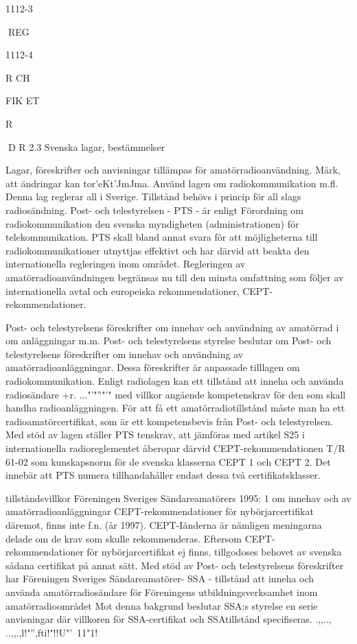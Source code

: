 \documentclass[a4paper,twoside,twocolumn,openright]{book}
\begin{document}
{{{{{1112-3

REG

1112-4

R CH

FIK ET

R

D R
2.3 Svenska lagar, bestämmelser

Lagar, föreskrifter och anvisningar
tillämpas för amatörradioanvändning.
Märk, att ändringar kan tor'eKt'JmJma.
Använd
lagen om radiokommunikation m.fl.
Denna lag reglerar all
i
Sverige. Tillstånd behövs i princip för all
slags radiosändning.
Post- och telestyrelsen - PTS - är enligt
Förordning om radiokommunikation den
svenska myndigheten (administrationen) för
telekommunikation. PTS skall bland annat
svara för att möjligheterna till radiokommunikationer utnyttjas effektivt och har därvid att
beakta den internationella regleringen inom
området. Regleringen av amatörradioanvändningen begränsas nu till den minsta
omfattning som följer av internationella avtal
och europeiska rekommendationer,
CEPT-rekommendationer.

Post- och telestyrelsens föreskrifter om
innehav och användning av amatörrad i om
anläggningar m.m.
Post- och telestyrelsens styrelse beslutar
om Post- och telestyrelsens föreskrifter om
innehav och användning av amatörradioanläggningar. Dessa föreskrifter är anpassade tilllagen om radiokommunikation.
Enligt radiolagen kan ett tillstånd att
inneha och använda radiosändare +r. ..."'"''"'"
med villkor angående kompetenskrav för
den som skall handha radioanläggningen.
För att få ett amatörradiotillstånd måste
man ha ett radioamatörcertifikat, som är ett
kompetensbevis från Post- och telestyrelsen. Med stöd av lagen ställer PTS
tenskrav, att jämföras med artikel S25 i
internationella radioreglementet
åberopar därvid CEPT-rekommendationen
T/R 61-02 som kunskapsnorm för de svenska klasserna CEPT 1 och CEPT 2.
Det innebär att PTS numera tillhandahåller endast dessa två certifikatsklasser.

tillståndsvillkor
Föreningen Sveriges Sändareamatörers
1995: 1 om innehav och
av amatörradioanläggningar
CEPT-rekommendationer för nybörjarcertifikat däremot, finns inte f.n. (år 1997).
CEPT-Iänderna är nämligen meningarna delade om de krav som skulle
rekommenderas. Eftersom CEPT-rekommendationer för nybörjarcertifikat ej finns,
tillgodoses behovet av svenska sådana certifikat på annat sätt.
Med stöd av Post- och telestyrelsens
föreskrifter har Föreningen Sveriges Sändareamatörer- SSA - tillstånd att inneha
och använda amatörradiosändare för Föreningens utbildningsverksamhet inom amatörradioområdet Mot denna bakgrund beslutar SSA:s styrelse en serie anvisningar
där villkoren för SSA-certifikat och SSAtillstånd specifiseras.
.,,.., ..,,.,l!"'',fti!"!!U"'\ 11"1!

}}}}}
\end{document}
